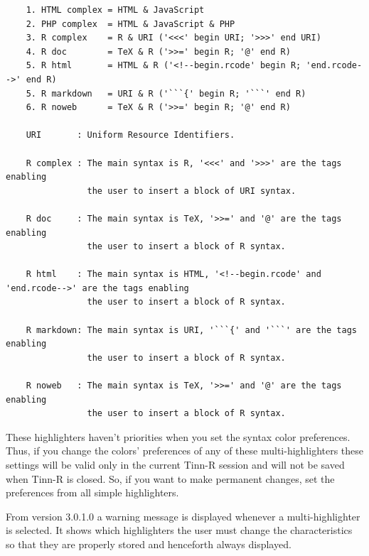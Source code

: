 \begin{footnotesize}
  \begin{verbatim}
    1. HTML complex = HTML & JavaScript
    2. PHP complex  = HTML & JavaScript & PHP
    3. R complex    = R & URI ('<<<' begin URI; '>>>' end URI)
    4. R doc        = TeX & R ('>>=' begin R; '@' end R)
    5. R html       = HTML & R ('<!--begin.rcode' begin R; 'end.rcode-->' end R)
    5. R markdown   = URI & R ('```{' begin R; '```' end R)
    6. R noweb      = TeX & R ('>>=' begin R; '@' end R)

    URI       : Uniform Resource Identifiers.

    R complex : The main syntax is R, '<<<' and '>>>' are the tags enabling
                the user to insert a block of URI syntax.

    R doc     : The main syntax is TeX, '>>=' and '@' are the tags enabling
                the user to insert a block of R syntax.

    R html    : The main syntax is HTML, '<!--begin.rcode' and 'end.rcode-->' are the tags enabling
                the user to insert a block of R syntax.

    R markdown: The main syntax is URI, '```{' and '```' are the tags enabling
                the user to insert a block of R syntax.

    R noweb   : The main syntax is TeX, '>>=' and '@' are the tags enabling
                the user to insert a block of R syntax.

  \end{verbatim}
\end{footnotesize}

These highlighters haven't priorities when you set the syntax color preferences.
Thus, if you change the colors' preferences of any of these multi-highlighters
these settings will be valid only in the current Tinn-R session and will not be
saved when Tinn-R is closed. So, if you want to make permanent changes, set the
preferences from all simple highlighters.

From version 3.0.1.0 a warning message is displayed whenever
a multi-highlighter is selected. It shows which highlighters the user
must change the characteristics so that they are properly stored and
henceforth always displayed.
